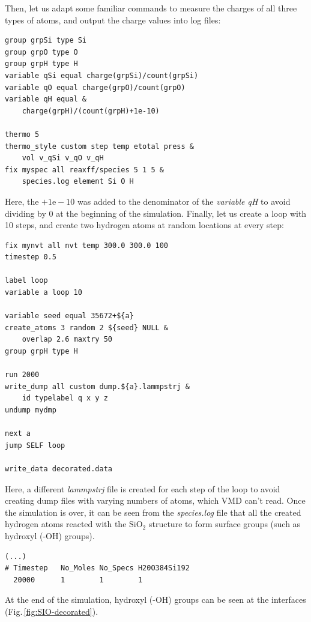 \documentclass[9pt,tutorial]{livecoms}
\begin{document}
Then, let us adapt some familiar commands to measure the charges of all three
types of atoms, and output the charge values into log files:
{\normalsize \begin{verbatim}
group grpSi type Si
group grpO type O
group grpH type H
variable qSi equal charge(grpSi)/count(grpSi)
variable qO equal charge(grpO)/count(grpO)
variable qH equal &
    charge(grpH)/(count(grpH)+1e-10)

thermo 5
thermo_style custom step temp etotal press &
    vol v_qSi v_qO v_qH
fix myspec all reaxff/species 5 1 5 &
    species.log element Si O H
\end{verbatim}}
Here, the $+1\text{e}-10$ was added to the denominator of the \textit{variable qH}
to avoid dividing by 0 at the beginning of the simulation. Finally, let us
create a loop with 10 steps, and create two hydrogen atoms at random locations at
every step:
{\normalsize \begin{verbatim}
fix mynvt all nvt temp 300.0 300.0 100
timestep 0.5

label loop
variable a loop 10

variable seed equal 35672+${a}
create_atoms 3 random 2 ${seed} NULL &
    overlap 2.6 maxtry 50
group grpH type H

run 2000
write_dump all custom dump.${a}.lammpstrj &
    id typelabel q x y z
undump mydmp

next a
jump SELF loop

write_data decorated.data
\end{verbatim}}
Here, a different \textit{lammpstrj} file is created for each step of the loop
to avoid creating dump files with varying numbers of atoms, which VMD can't read.
Once the simulation is over, it can be seen from the \textit{species.log} file that
all the created hydrogen atoms reacted with the $\text{SiO}_{2}$ structure to
form surface groups (such as hydroxyl (-OH) groups).
{\normalsize \begin{verbatim}
(...)
# Timestep   No_Moles No_Specs H20O384Si192
  20000      1        1        1
\end{verbatim}}
At the end of the simulation, hydroxyl (-OH) groups can be seen at the interfaces
(Fig.\,\ref{fig:SIO-decorated}).
\end{document}
